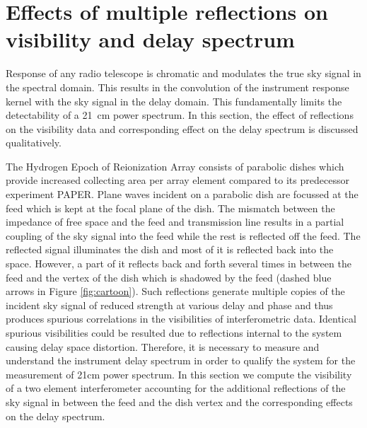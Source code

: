 \documentclass[twocolumn]{emulateapj}
\begin{document}


\section{Effects of multiple reflections on visibility and delay spectrum}
Response of any radio telescope is chromatic and modulates the true sky signal in the spectral domain. This results in the convolution of the instrument response kernel with the sky signal in the delay domain.
This fundamentally limits the detectability of a 21~cm power spectrum. In this section, the effect of reflections on the visibility data and corresponding effect on the delay spectrum is discussed qualitatively.
 
The Hydrogen Epoch of Reionization Array consists of parabolic dishes which provide increased collecting area per array element compared to its predecessor experiment PAPER. Plane waves incident on a parabolic dish are focussed at the feed which is kept at the focal plane of the dish.
The mismatch between the impedance of free space and the feed and transmission line results in a partial coupling of the sky signal into the feed while the rest is reflected off the feed. 
The reflected signal illuminates the dish and most of it is reflected back into the space.
However, a part of it reflects back and forth several times in between the feed and the vertex of the dish which is shadowed by the feed (dashed blue arrows in Figure \ref{fig:cartoon}).
Such reflections generate multiple copies of the incident sky signal of reduced strength at various delay and phase and thus produces spurious correlations in the visibilities of interferometric data.  Identical spurious visibilities could be resulted due to reflections internal to the system causing delay space distortion. Therefore, it is necessary to measure and understand the instrument delay spectrum in order to qualify the system for the measurement of 21cm power spectrum. 
In this section we compute the visibility of a two element interferometer accounting for the additional reflections of the sky signal in between the feed and the dish vertex and the corresponding effects on the delay spectrum. 
\end{document}
